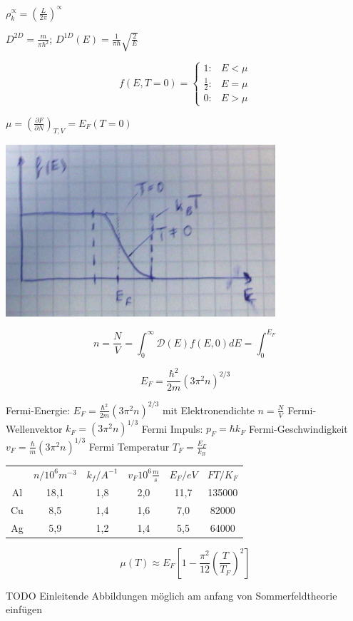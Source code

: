 \(\rho^\propto_k=\left(\frac{L}{2\pi}\right)^\propto\)

\(D^{2D}=\frac{m}{\pi \hbar^2}\); \(D^{1D}(E) = \frac{1}{\pi\hbar} \sqrt{\frac{2}{E}}\)

\[f(E,T=0) = \begin{cases}
  1: & E<\mu \\
  \frac{1}{2}: & E=\mu \\
  0: & E>\mu 
\end{cases}
\]

\(\mu = \left(\frac{\partial F}{\partial N}\right)_{T,V}=E_F(T=0)\)

\includegraphics[width=0.75\textwidth]{kap06_26.png}

\[n=\frac{N}{V}=\int_0^\infty \mathcal D(E) f(E,0)dE = \int_0^{E_F}\]

\[E_F = \frac{\hbar^2}{2m}(3\pi^2n)^{2/3}\]

Fermi-Energie: \(E_F = \frac{\hbar^2}{2m}(3\pi^2 n)^{2/3}\) mit Elektronendichte \(n=\frac{N}{V}\)
Fermi-Wellenvektor \(k_F=(3\pi^2n)^{1/3}\)
Fermi Impuls: \(p_F = \hbar k_F\)
Fermi-Geschwindigkeit \(v_F = \frac{\hbar}{m}(3\pi^2 n)^{1/3}\)
Fermi Temperatur \(T_F = \frac{E_F}{k_B}\)


\begin{tabular}{cccccc}
&\(n/10^{6}m^{-3}\)&\(k_f/A^{-1}\)&\(v_F10^{6}\frac{m}{s}\)&\(E_F/eV\)&\(FT/K_F\)\\
Al&18,1&1,8&2,0&11,7&135000\\
Cu&8,5&1,4&1,6&7,0&82000\\
Ag&5,9&1,2&1,4&5,5&64000
\end{tabular}


\[\boxed{\mu(T)\approx E_F [1-\frac{\pi^2}{12}\left(\frac{T}{T_F}\right)^2]}\]


TODO Einleitende Abbildungen möglich am anfang von Sommerfeldtheorie einfügen


